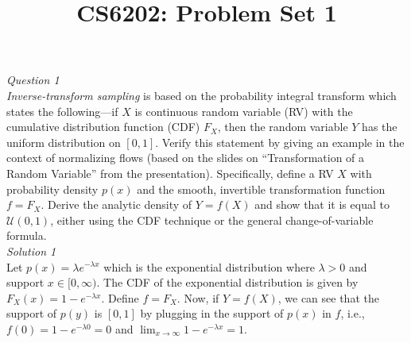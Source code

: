 \documentclass{article}
\title{CS6202: Problem Set 1}
\date{}
\begin{document}
\maketitle

\noindent\emph{Question 1}
\\[3pt]
\textit{Inverse-transform sampling} is based on the probability integral transform which states the following---if $X$ is continuous random variable (RV) with the cumulative distribution function (CDF) $F_X$, then the random variable $Y$ has the uniform distribution on $[0,1]$. Verify this statement by giving an example in the context of normalizing flows (based on the slides on ``Transformation of a Random Variable'' from the presentation). Specifically, define a RV $X$ with probability density $p(x)$ and the smooth, invertible transformation function $f = F_X$. Derive the analytic density of $Y = f(X)$ and show that it is equal to $\mathcal{U}(0,1)$, either using the CDF technique or the general change-of-variable formula.  
\\[10pt]
\emph{Solution 1}
\\[3pt]
Let $p(x) = \lambda e^{-\lambda x}$ which is the exponential distribution where $\lambda > 0$ and support $x\in[0,\infty)$. The CDF of the exponential distribution is given by $F_X(x) = 1 - e^{-\lambda x}$. Define $f = F_X$. Now, if $Y = f(X)$, we can see that the support of $p(y)$ is $[0,1]$ by plugging in the support of $p(x)$ in $f$, i.e., $f(0) = 1 - e^{-\lambda 0} = 0$ and $\lim_{x\to\infty}1 - e^{-\lambda x} = 1$.
\end{document}
